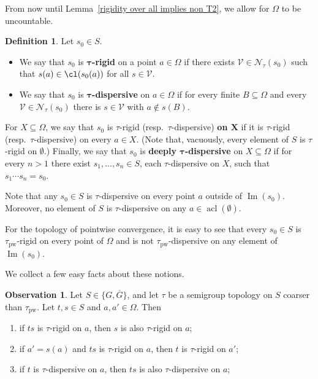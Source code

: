 \documentclass{article}
\theoremstyle{remark}
\theoremstyle{definition}
\newtheorem{definition}[theorem]{Definition}
\newtheorem{observation}[theorem]{Observation}
\DeclareMathOperator{\acl}{acl}
\newcommand{\V}[0]{\mathcal{V}}
\DeclareMathOperator{\im}{Im}
\newcommand{\pw}[0]{\tau_{\mathrm{pw}}}
\begin{document}
{{{{{ 
  

  

 {From now until Lemma~\ref{rigidity over all implies non T2}, we allow for $\Omega$ to be uncountable.}

 \begin{definition}
  Let $s_0 \in S$.
  \begin{itemize}
    \item We say that $s_0$ is $\bm{\tau}$\textbf{-rigid} on a point
      $a \in \Omega$ if there exists $\V \in \mathcal{N}_\tau(s_0)$ such that
      $s(a) \in \cl(s_0(a))$ for all $s \in \V$.

    \item We say that $s_0$ is $\bm{\tau}$\textbf{-dispersive} on $a\in\Omega$ if for
      every finite $B \subseteq \Omega$ and every
      $\V \in \mathcal{N}_\tau(s_0)$ there is $s \in \V$ with
      $a \notin s(B)$.
  \end{itemize}
  For $X \subseteq \Omega$, we say that $s_0$ is $\tau$-rigid
  (resp.\ $\tau$-dispersive) \textbf{on $\bm{X}$} if it is $\tau$-rigid
  (resp.\ $\tau$-dispersive) on every $a \in X$. {(Note that, vacuously, every element of $S$ is $\tau$-rigid on $\emptyset$.)}
  Finally, we say that $s_0$ is \textbf{deeply
  $\bm{\tau}$\textbf{-dispersive}} on $X \subseteq \Omega$ if for every $n > 1$
  there exist $s_1, \dots, s_n \in S$, each $\tau$-dispersive on $X$, such that
  $s_1 \cdots s_n = s_0$. 
\end{definition} 
  
 
    
  

  Note that any $s_{0}\in S$ is
  $\tau$-dispersive on every point $a$ outside of $\im(s_{0})$. {Moreover, no element of $S$ is $\tau$-dispersive on any $a\in\acl(\emptyset)$.}
  
  {For the topology of pointwise convergence, it is easy to see that
every $s_0 \in S$ is $\pw$-rigid on every point of $\Omega$ and is not
$\pw$-dispersive on any element of $\im(s_0)$.}


  We collect a few easy facts about these notions.  
  \begin{observation}\label{moving tau dispersiveness around} Let $S\in\{G, \overline{G}\}$, and let $\tau$ be a semigroup topology on $S$ coarser than $\pw$. 
  	Let $t,s\in S$ and $a,a'\in\Omega$. Then  
     \begin{enumerate}
     	\item \label{obs1} if $ts$ is $\tau$-rigid on $a$, then $s$ is also $\tau$-rigid on $a$;
     	\item \label{obs2}
        if $a'=s(a)$ and $ts$ is $\tau$-rigid on $a$, then $t$ is $\tau$-rigid on $a'$;
     	\item \label{obs3} if $t$ is $\tau$-dispersive on $a$,  then $ts$ is also $\tau$-dispersive on $a$;
        

\end{enumerate}
\end{observation}}}}}}
\end{document}
